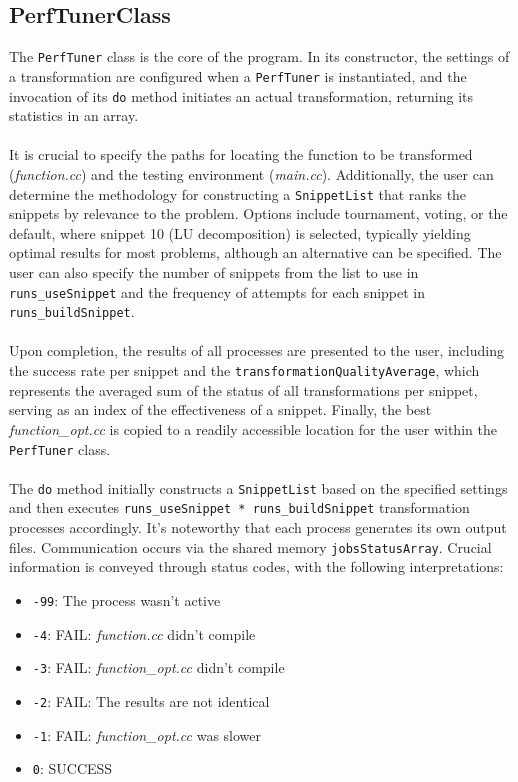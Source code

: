 \documentclass[twocolumn]{article}
\begin{document}
\subsection{PerfTunerClass}
\label{PerfTunerClass}
The \texttt{PerfTuner} class is the core of the program. In its constructor, the settings of a transformation are configured when a \texttt{PerfTuner} is instantiated, and the invocation of its \texttt{do} method initiates an actual transformation, returning its statistics in an array.\\ 
\\
It is crucial to specify the paths for locating the function to be transformed (\textit{function.cc}) and the testing environment (\textit{main.cc}). Additionally, the user can determine the methodology for constructing a \texttt{SnippetList} that ranks the snippets by relevance to the problem. Options include tournament, voting, or the default, where snippet 10 (LU decomposition) is selected, typically yielding optimal results for most problems, although an alternative can be specified. The user can also specify the number of snippets from the list to use in \texttt{runs\_useSnippet} and the frequency of attempts for each snippet in \texttt{runs\_buildSnippet}.\\
\\
Upon completion, the results of all processes are presented to the user, including the success rate per snippet and the \texttt{transformationQualityAverage}, which represents the averaged sum of the status of all transformations per snippet, serving as an index of the effectiveness of a snippet. Finally, the best \textit{function\_opt.cc} is copied to a readily accessible location for the user within the \texttt{PerfTuner} class.\\
\\
The \texttt{do} method initially constructs a \texttt{SnippetList} based on the specified settings and then executes \texttt{runs\_useSnippet * runs\_buildSnippet} transformation processes accordingly. It's noteworthy that each process generates its own output files. Communication occurs via the shared memory \texttt{jobsStatusArray}. Crucial information is conveyed through status codes, with the following interpretations:
\begin{itemize}
    \item \texttt{-99}: The process wasn't active
    \item \texttt{-4}: FAIL: \textit{function.cc} didn't compile
    \item \texttt{-3}: FAIL: \textit{function\_opt.cc} didn't compile
    \item \texttt{-2}: FAIL: The results are not identical
    \item \texttt{-1}: FAIL: \textit{function\_opt.cc} was slower
    \item \texttt{0}: SUCCESS
\end{itemize}
\end{document}
